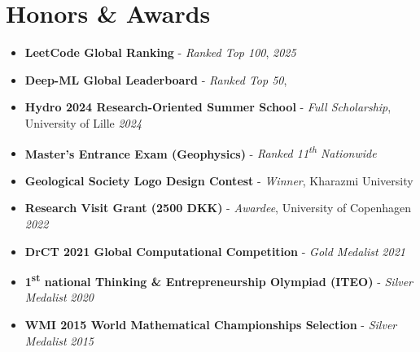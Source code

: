 \documentclass[letterpaper,11pt]{article}
\begin{document}
	\section{Honors \& Awards}
	\begin{itemize}[left=0pt, label={}, topsep=7.5pt,partopsep=0pt,itemsep=3.5pt,parsep=0pt]
		\item \textbf{LeetCode Global Ranking} - \textit{Ranked Top 100}, \href{https://leetcode.com/u/aradfarahani/}{} \hfill \textit{2025}
		\item \textbf{Deep-ML Global Leaderboard} - \textit{Ranked Top 50}, \href{https://www.deep-ml.com/leaderboard}{} \hfill \textit{}
		\item \textbf{Hydro 2024 Research-Oriented Summer School} - \textit{Full Scholarship}, University of Lille \hfill \textit{2024}
		\item \textbf{Master's Entrance Exam (Geophysics)} - \textit{Ranked 11\textsuperscript{th} Nationwide} \hfill \textit{}
		\item \textbf{Geological Society Logo Design Contest} - \textit{Winner}, Kharazmi University \hfill \textit{}
		\item \textbf{Research Visit Grant (2500 DKK)} - \textit{Awardee}, University of Copenhagen \hfill \textit{2022}
		\item \textbf{DrCT 2021 Global Computational Competition} - \textit{Gold Medalist} \hfill \textit{2021}
		\item \textbf{1\textsuperscript{st} national Thinking \& Entrepreneurship Olympiad (ITEO)} - \textit{Silver Medalist} \hfill \textit{2020}
		\item \textbf{WMI 2015 World Mathematical Championships Selection} - \textit{Silver Medalist} \hfill \textit{2015}	
	\end{itemize}
	\vspace{-1.0em}
	
	\vspace{-0.5em} 
\end{document}
